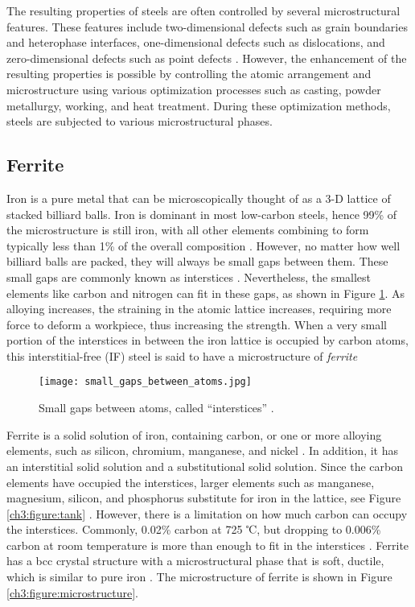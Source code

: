 The resulting properties of steels are often controlled by several microstructural features. These features include two-dimensional defects such as grain boundaries and heterophase interfaces, one-dimensional defects such as dislocations, and zero-dimensional defects such as point defects \cite{clemens2017microstructure}. However, the enhancement of the resulting properties is possible by controlling the atomic arrangement and microstructure using various optimization processes such as casting, powder metallurgy, working, and heat treatment. During these optimization methods, steels are subjected to various microstructural phases.

\subsection{Ferrite} 
Iron is a pure metal that can be microscopically thought of as a 3-D lattice of stacked billiard balls. Iron is dominant in most low-carbon steels, hence 99\% of the microstructure is still iron, with all other elements combining to form typically less than 1\% of the overall composition \cite{bajaj2020steels}. However, no matter how well billiard balls are packed, they will always be small gaps between them. These small gaps are commonly known as interstices \cite{bajaj2020steels}. Nevertheless, the smallest elements like carbon and nitrogen can fit in these gaps, as shown in Figure \ref{ch3:figure:gaps}. As alloying increases, the straining in the atomic lattice increases, requiring more force to deform a workpiece, thus increasing the strength. When a very small portion of the interstices in between the iron lattice is occupied by carbon atoms, this interstitial-free (IF) steel is said to have a microstructure of \emph{ferrite} \cite{bhadeshia2017steels}
 
\begin{figure}[H]
    \centering
    \texttt{[image: small\_gaps\_between\_atoms.jpg]}
    \caption{Small gaps between atoms, called “interstices” \cite{bajaj2020steels}.}
    \label{ch3:figure:gaps}
\end{figure}

Ferrite is a solid solution of iron, containing carbon, or one or more alloying elements, such as silicon, chromium, manganese, and nickel \cite{molabe2018determining}. In addition, it has an interstitial solid solution and a substitutional solid solution. Since the carbon elements have occupied the interstices, larger elements such as manganese, magnesium, silicon, and phosphorus substitute for iron in the lattice, see Figure \ref{ch3:figure:tank} \cite{jones2012engineering}. However, there is a limitation on how much carbon can occupy the interstices. Commonly, 0.02\% carbon at 725 ℃, but dropping to 0.006\% carbon at room temperature is more than enough to fit in the interstices \cite{bhadeshia2017steels}. Ferrite has a bcc crystal structure with a microstructural phase that is soft, ductile, which is similar to pure iron \cite{bajaj2020steels}. The microstructure of ferrite is shown in Figure \ref{ch3:figure:microstructure}.

